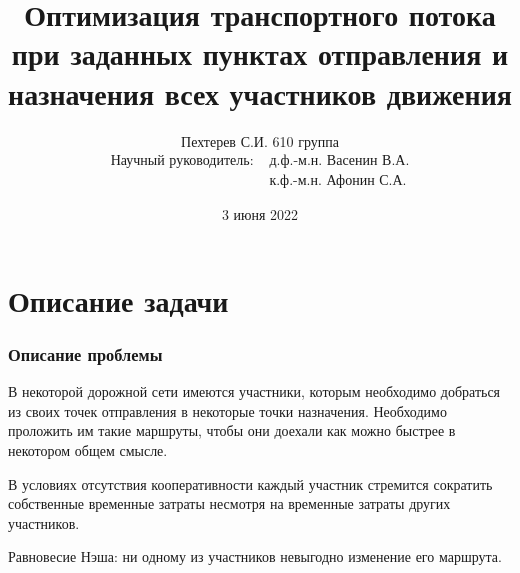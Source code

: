 \documentclass{beamer}
\begin{document}
\title{Оптимизация транспортного потока при заданных пунктах отправления и назначения всех участников движения}
\author{Пехтерев С.И. 610 группа
	\begin{align*}
		\text{Научный руководитель:} & \text{ д.ф.-м.н. Васенин В.А.} \\
		\text{} & \text{ к.ф.-м.н. Афонин С.А.}
	\end{align*}}
\date[03.06.2022]{3 июня 2022}

\maketitle



\section{Описание задачи}

\begin{frame}\frametitle{Описание проблемы}
	В некоторой дорожной сети имеются участники, которым необходимо добраться из своих точек отправления в некоторые точки назначения. Необходимо проложить им такие маршруты, чтобы они доехали как можно быстрее в некотором общем смысле.
	
	\bigskip
	В условиях отсутствия кооперативности каждый участник стремится сократить собственные временные затраты несмотря на временные затраты других участников.
	
	\bigskip
	Равновесие Нэша: ни одному из участников невыгодно изменение его маршрута.
	
\end{frame}
\end{document}
